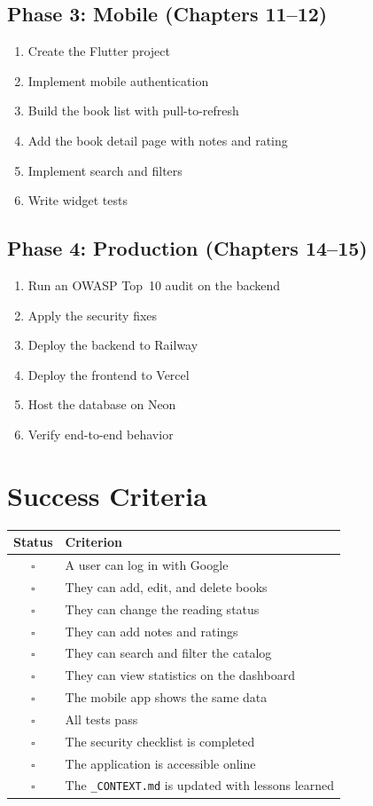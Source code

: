 \subsection{Phase 3: Mobile (Chapters 11--12)}
\begin{enumerate}
  \item Create the Flutter project
  \item Implement mobile authentication
  \item Build the book list with pull-to-refresh
  \item Add the book detail page with notes and rating
  \item Implement search and filters
  \item Write widget tests
\end{enumerate}

\subsection{Phase 4: Production (Chapters 14--15)}
\begin{enumerate}
  \item Run an OWASP Top~10 audit on the backend
  \item Apply the security fixes
  \item Deploy the backend to Railway
  \item Deploy the frontend to Vercel
  \item Host the database on Neon
  \item Verify end-to-end behavior
\end{enumerate}

\section{Success Criteria}

\begin{center}
\begin{tabularx}{\textwidth}{c X}
\toprule
\textbf{Status} & \textbf{Criterion} \\
\midrule
$\square$ & A user can log in with Google \\
$\square$ & They can add, edit, and delete books \\
$\square$ & They can change the reading status \\
$\square$ & They can add notes and ratings \\
$\square$ & They can search and filter the catalog \\
$\square$ & They can view statistics on the dashboard \\
$\square$ & The mobile app shows the same data \\
$\square$ & All tests pass \\
$\square$ & The security checklist is completed \\
$\square$ & The application is accessible online \\
$\square$ & The \texttt{\_CONTEXT.md} is updated with lessons learned \\
\bottomrule
\end{tabularx}
\end{center}

